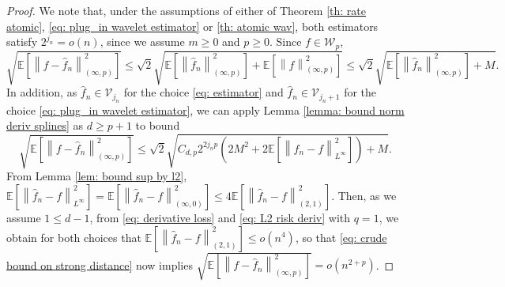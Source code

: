 \documentclass[preprint]{imsart}
\newcommand\norm[1]{\left\lVert#1\right\rVert}
\numberwithin{equation}{section}
\begin{document}
\begin{appendix}
\begin{proof}
We note that, under the assumptions of either of Theorem \eqref{th: rate atomic}, \eqref{eq: plug_in wavelet estimator} or \eqref{th: atomic wav}, both estimators satisfy $2^{j_n}=o\left(n\right)$, since we assume $m\geq0$ and $p\geq 0$.
Since $f\in\mathcal{W}_p$, 
\[\sqrt{\mathbb{E}\left[\norm{f-\hat{f}_n}_{(\infty,p)}^2\right]}\leq \sqrt{2}\sqrt{\mathbb{E}\left[\norm{\hat{f}_n}_{(\infty,p)}^2\right]+\mathbb{E}\left[\norm{f}_{(\infty,p)}^2\right]}\leq \sqrt{2}\sqrt{\mathbb{E}\left[\norm{\hat{f}_n}_{(\infty,p)}^2\right]+M}.\]
In addition, as $\hat{f}_n\in \mathcal{V}_{j_n}$ for the choice \eqref{eq: estimator} and $\hat{f}_n\in \mathcal{V}_{j_n+1}$ for the choice \eqref{eq: plug_in wavelet estimator}, we can apply Lemma \ref{lemma: bound norm deriv splines} as $d\geq p+1$ to bound
\begin{equation}\label{eq: crude bound on strong distance}
\sqrt{\mathbb{E}\left[\norm{f-\hat{f}_n}_{(\infty,p)}^2\right]}\leq \sqrt{2}\sqrt{C_{d,p}2^{2j_np}\left(2M^2+2\mathbb{E}\left[\norm{\hat{f}_n-f}_{L^\infty}^2\right]\right)+M}.
\end{equation}
From Lemma \ref{lem: bound sup by l2}, $\mathbb{E}\left[\norm{\hat{f}_n-f}_{L^\infty}^2\right]=\mathbb{E}\left[\norm{\hat{f}_n-f}_{(\infty,0)}^2\right]\leq 4 \mathbb{E}\left[\norm{\hat{f}_n-f}_{(2,1)}^2\right]$. Then, as we assume $1\leq d-1$, from \eqref{eq: derivative loss} and \eqref{eq: L2 risk deriv} with $q=1$, we obtain for both choices that $\mathbb{E}\left[\norm{\hat{f}_n-f}_{(2,1)}^2\right]\leq o\left(n^4\right)$, so that \eqref{eq: crude bound on strong distance} now implies $\sqrt{\mathbb{E}\left[\norm{f-\hat{f}_n}_{(\infty,p)}^2\right]}=o(n^{2+p})$.


\end{proof}
\end{appendix}
\end{document}
